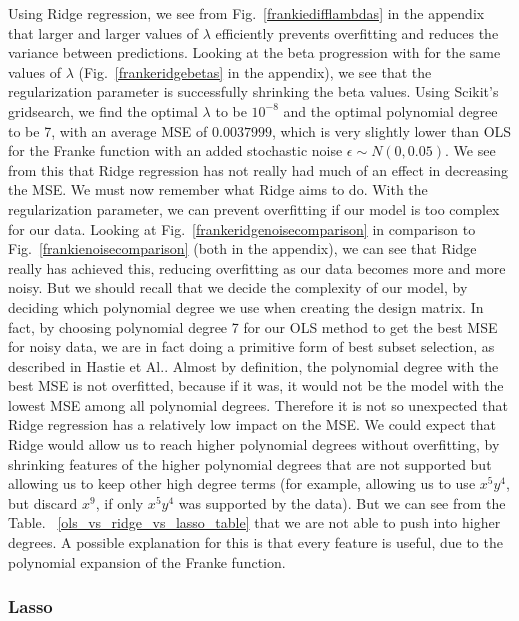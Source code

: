 \documentclass[twocolumn,10pt,cleanfoot]{asme2ej}
\begin{document}
Using Ridge regression, we see from Fig.~\ref{frankiedifflambdas} in the appendix that larger and larger values of $\lambda$ efficiently prevents overfitting and reduces the variance between predictions. Looking at the beta progression with for the same values of $\lambda$ (Fig.~\ref{frankeridgebetas} in the appendix), we see that the regularization parameter is successfully shrinking the beta values. Using Scikit's gridsearch, we find the optimal $\lambda$ to be $10^{-8}$ and the optimal polynomial degree to be 7, with an average MSE of $0.0037999$, which is very slightly lower than OLS for the Franke function with an added stochastic noise $\epsilon \sim N(0,0.05)$. We see from this that Ridge regression has not really had much of an effect in decreasing the MSE. We must now remember what Ridge aims to do. With the regularization parameter, we can prevent overfitting if our model is too complex for our data. Looking at Fig.~\ref{frankeridgenoisecomparison} in comparison to Fig.~\ref{frankienoisecomparison} (both in the appendix), we can see that Ridge really has achieved this, reducing overfitting as our data becomes more and more noisy. But we should recall that we decide the complexity of our model, by deciding which polynomial degree we use when creating the design matrix. In fact, by choosing polynomial degree 7 for our OLS method to get the best MSE for noisy data, we are in fact doing a primitive form of best subset selection, as described in Hastie et Al.\cite[57]{hastie}. Almost by definition, the polynomial degree with the best MSE is not overfitted, because if it was, it would not be the model with the lowest MSE among all polynomial degrees. Therefore it is not so unexpected that Ridge regression has a relatively low impact on the MSE. We could expect that Ridge would allow us to reach higher polynomial degrees without overfitting, by shrinking features of the higher polynomial degrees that are not supported but allowing us to keep other high degree terms (for example, allowing us to use $x^5y^4$, but discard $x^9$, if only $x^5y^4$ was supported by the data). But we can see from the Table. ~\ref{ols_vs_ridge_vs_lasso_table} that we are not able to push into higher degrees. A possible explanation for this is that every feature is useful, due to the polynomial expansion of the Franke function. 

\subsubsection{Lasso}
\end{document}
